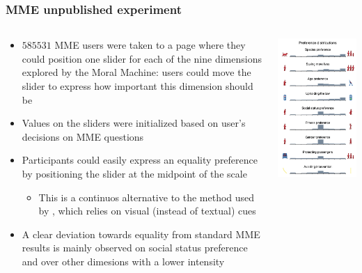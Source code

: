\documentclass[aspectratio=169]{beamer}
\begin{document}
\begin{frame}
    \frametitle{MME unpublished experiment}
    \begin{columns}
        \begin{column}{0.6\linewidth}
            \begin{itemize}
                \item $585531$ MME users were taken to a page where they could position one slider for each of the nine dimensions explored by the Moral Machine: users could move the slider to express how important this dimension should be
                \item Values on the sliders were initialized based on user's decisions on MME questions
                \item Participants could easily express an equality preference by positioning the slider at the midpoint of the scale 
                \begin{itemize}
                    \item This is a continuos alternative to the method used by \citeauthor{against-mme}, which relies on visual (instead of textual) cues
                \end{itemize}
                \item A clear deviation towards equality from standard MME results is mainly observed on social status preference and over other dimesions with a lower intensity
            \end{itemize}
        \end{column}
        \begin{column}{0.4\linewidth}
            \includegraphics[width=0.7\linewidth]{assets/reply-against-mme-experiment.png}

\end{column}
\end{columns}
\end{frame}
\end{document}
